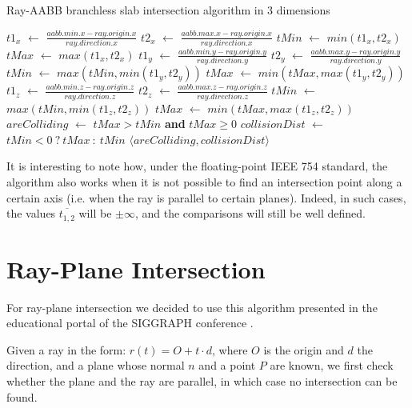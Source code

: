 \documentclass{PoliMi_MasterThesis}
\newcommand*\Let[2]{\State #1 $\gets$ #2}
\newcommand*\AAnd{\textbf{ and }}
\begin{document}
\begin{algorithm}[H]
	\caption{Ray-AABB branchless slab intersection algorithm in 3 dimensions}
	\begin{algorithmic}[1]
		\Let {$t1_x$}{$\frac{aabb.min.x - ray.origin.x}{ray.direction.x}$} 
		\Let {$t2_x$}{$\frac{aabb.max.x - ray.origin.x}{ray.direction.x}$}
		\Let {$tMin$}{$min(t1_x, t2_x)$}
		\Let {$tMax$}{$max(t1_x, t2_x)$}
		\Let {$t1_y$}{$\frac{aabb.min.y - ray.origin.y}{ray.direction.y}$} 
		\Let {$t2_y$}{$\frac{aabb.max.y - ray.origin.y}{ray.direction.y}$}
		\Let {$tMin$}{$ max(tMin, min(t1_y, t2_y))$}
		\Let {$tMax$}{$ min(tMax, max(t1_y, t2_y))$}
		\Let {$t1_z$}{$\frac{aabb.min.z - ray.origin.z}{ray.direction.z}$} 
		\Let {$t2_z$}{$\frac{aabb.max.z - ray.origin.z}{ray.direction.z}$}
		\Let {$tMin$}{$max(tMin, min(t1_z, t2_z))$}
		\Let {$tMax$}{$min(tMax, max(t1_z, t2_z))$}
		\Let {$areColliding$}{$tMax > tMin$ \AAnd $tMax \geq 0$}
		\Let {$collisionDist$}{$tMin < 0 \: ? \: tMax \: : \: tMin$}
		\State \Return $\langle areColliding, collisionDist \rangle$
		\EndFunction
	\end{algorithmic}
\end{algorithm} 

It is interesting to note how, under the floating-point IEEE 754 standard, the algorithm also works when it is not possible to find an intersection point along a certain axis (i.e. when the ray is parallel to certain planes). Indeed, in such cases, the values $\overline{t_{1,2}}$ will be $\pm \infty$, and the comparisons will still be well defined.

\section{Ray-Plane Intersection} \label{sec:ray_plane_intersection}
For ray-plane intersection we decided to use this algorithm presented in the educational portal of the SIGGRAPH conference \cite{ray_plane_intersection}.

Given a ray in the form: $r(t) = O + t\cdot d$, where $O$ is the origin and $d$ the direction, and a plane whose normal $n$ and a point $P$ are known, we first check whether the plane and the ray are parallel, in which case no intersection can be found.
\end{document}
